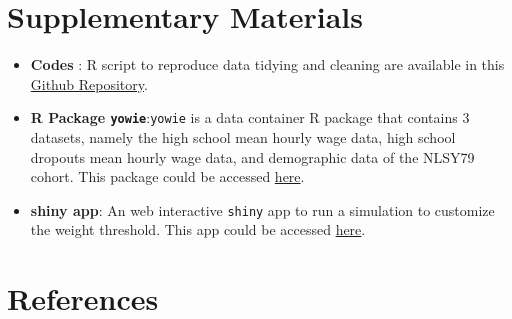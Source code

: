 \documentclass{article}
\begin{document}
\hypertarget{supplementary-materials}{%
\section{Supplementary Materials}\label{supplementary-materials}}

\begin{itemize}
\item
  \textbf{Codes} : R script to reproduce data tidying and cleaning are available in this \href{https://github.com/numbats/yowie/blob/master/data-raw/data_preprocessing.R}{Github Repository}.
\item
  \textbf{R Package \texttt{yowie}}:\texttt{yowie} is a data container R package that contains 3 datasets, namely the high school mean hourly wage data, high school dropouts mean hourly wage data, and demographic data of the NLSY79 cohort. This package could be accessed \href{https://github.com/numbats/yowie}{here}.
\item
  \textbf{shiny app}: An web interactive \texttt{shiny} app to run a simulation to customize the weight threshold. This app could be accessed \href{https://github.com/numbats/summer-wages-refresh/tree/main/app}{here}.
\end{itemize}

\hypertarget{references}{%
\section*{References}\label{references}}
\end{document}
